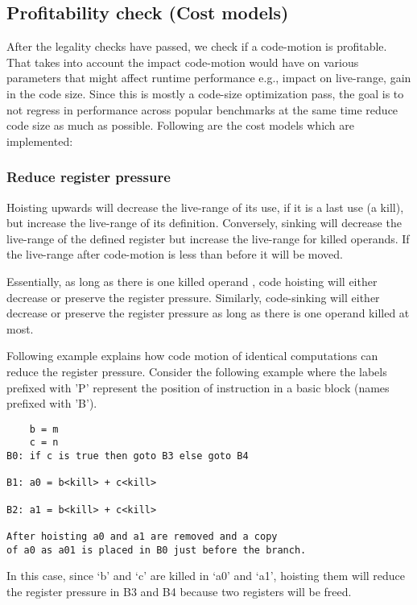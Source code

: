 \documentclass[acmlarge,review]{acmart}\settopmatter{printfolios=true}
\begin{document}
\subsection{Profitability check (Cost models)}
\label{sec:cost-models}
After the legality checks have passed, we check if a code-motion is profitable.
That takes into account the impact code-motion would have on various parameters
that might affect runtime performance e.g., impact on live-range, gain in the
code size. Since this is mostly a code-size optimization pass, the goal is to
not regress in performance across popular benchmarks at the same time reduce
code size as much as possible. Following are the cost models which are
implemented:

\subsubsection{Reduce register pressure}
\label{hoist:reg-pressure}
Hoisting upwards will decrease the live-range of its use, if it is a last use (a
kill), but increase the live-range of its definition. Conversely, sinking will
decrease the live-range of the defined register but increase the live-range for
killed operands. If the live-range after code-motion is less than before it will
be moved.

Essentially, as long as there is one killed operand , code hoisting will either
decrease or preserve the register pressure. Similarly, code-sinking will either
decrease or preserve the register pressure as long as there is one operand
killed at most.

Following example explains how code motion of identical computations can reduce
the register pressure.  Consider the following example where the labels prefixed
with 'P' represent the position of instruction in a basic block (names prefixed
with 'B').

\begin{verbatim}
    b = m
    c = n
B0: if c is true then goto B3 else goto B4

B1: a0 = b<kill> + c<kill>

B2: a1 = b<kill> + c<kill>

After hoisting a0 and a1 are removed and a copy
of a0 as a01 is placed in B0 just before the branch.
\end{verbatim}

In this case, since `b' and `c' are killed in `a0' and `a1', hoisting them will
reduce the register pressure in B3 and B4 because two registers will be freed.
\end{document}

